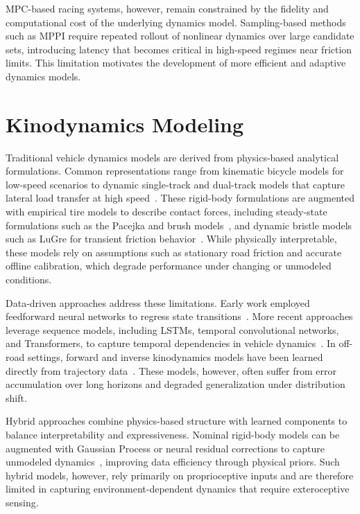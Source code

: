 MPC-based racing systems, however, remain constrained by the fidelity and computational cost of the underlying dynamics model. Sampling-based methods such as MPPI require repeated rollout of nonlinear dynamics over large candidate sets, introducing latency that becomes critical in high-speed regimes near friction limits. This limitation motivates the development of more efficient and adaptive dynamics models.

\section{Kinodynamics Modeling}
\label{sec:rw-kinodynamics}

Traditional vehicle dynamics models are derived from physics-based analytical formulations. Common representations range from kinematic bicycle models for low-speed scenarios to dynamic single-track and dual-track models that capture lateral load transfer at high speed~\cite{kong2015kinematic, rajamani2006vehicle}. These rigid-body formulations are augmented with empirical tire models to describe contact forces, including steady-state formulations such as the Pacejka and brush models~\cite{pacejka2005tire}, and dynamic bristle models such as LuGre for transient friction behavior~\cite{de1995new}. While physically interpretable, these models rely on assumptions such as stationary road friction and accurate offline calibration, which degrade performance under changing or unmodeled conditions.

Data-driven approaches address these limitations. Early work employed feedforward neural networks to regress state transitions~\cite{spielberg2019neural}. More recent approaches leverage sequence models, including LSTMs, temporal convolutional networks, and Transformers, to capture temporal dependencies in vehicle dynamics~\cite{zhai2025neural,peng2025transformer}. In off-road settings, forward and inverse kinodynamics models have been learned directly from trajectory data~\cite{xiao2021learning,datar2024learning}. These models, however, often suffer from error accumulation over long horizons and degraded generalization under distribution shift.

Hybrid approaches combine physics-based structure with learned components to balance interpretability and expressiveness. Nominal rigid-body models can be augmented with Gaussian Process or neural residual corrections to capture unmodeled dynamics~\cite{kabzan2019learning}, improving data efficiency through physical priors. Such hybrid models, however, rely primarily on proprioceptive inputs and are therefore limited in capturing environment-dependent dynamics that require exteroceptive sensing.

